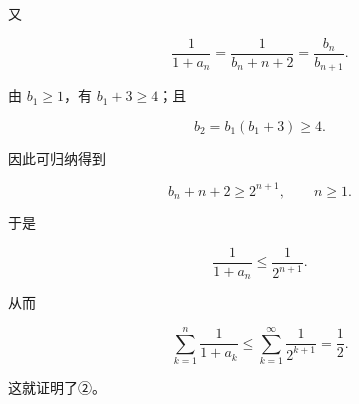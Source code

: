 \begin{answer}
又

\nopagebreak[4]
\[
\frac1{1+a_n}
=\frac1{b_n+n+2}
=\frac{b_n}{b_{n+1}}.
\]

由 $b_1\geqslant1$，有 $b_1+3\geqslant4$；且

\nopagebreak[4]
\[
b_2=b_1(b_1+3)\geqslant4.
\]

因此可归纳得到

\nopagebreak[4]
\[
b_n+n+2\geqslant2^{n+1},\qquad n\geqslant1.
\]

于是

\nopagebreak[4]
\[
\frac1{1+a_n}\leqslant\frac1{2^{n+1}}.
\]

从而

\nopagebreak[4]
\[
\sum_{k=1}^n\frac1{1+a_k}
\leqslant\sum_{k=1}^{\infty}\frac1{2^{k+1}}
=\frac12.
\]

这就证明了②。



\end{answer}